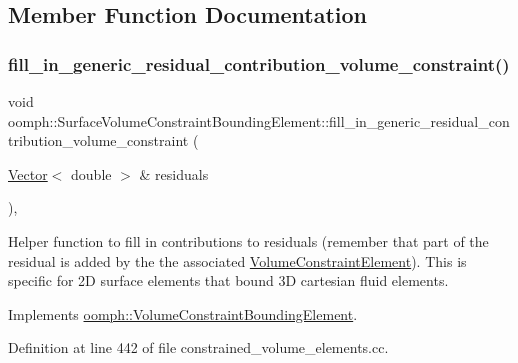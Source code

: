 \subsection{Member Function Documentation}
\mbox{\label{classoomph_1_1SurfaceVolumeConstraintBoundingElement_a5813fa65063eb55a5b264539d77cac88}} 
\subsubsection{\texorpdfstring{fill\+\_\+in\+\_\+generic\+\_\+residual\+\_\+contribution\+\_\+volume\+\_\+constraint()}{fill\_in\_generic\_residual\_contribution\_volume\_constraint()}}
{\footnotesize\ttfamily void oomph\+::\+Surface\+Volume\+Constraint\+Bounding\+Element\+::fill\+\_\+in\+\_\+generic\+\_\+residual\+\_\+contribution\+\_\+volume\+\_\+constraint (\begin{DoxyParamCaption}\item[{\hyperlink{classoomph_1_1Vector}{Vector}$<$ double $>$ \&}]{residuals }\end{DoxyParamCaption})\hspace{0.3cm}{\ttfamily [protected]}, {\ttfamily [virtual]}}



Helper function to fill in contributions to residuals (remember that part of the residual is added by the the associated \hyperlink{classoomph_1_1VolumeConstraintElement}{Volume\+Constraint\+Element}). This is specific for 2D surface elements that bound 3D cartesian fluid elements. 



Implements \hyperlink{classoomph_1_1VolumeConstraintBoundingElement_a717f1085709bd8820b8043ff94ecb0c5}{oomph\+::\+Volume\+Constraint\+Bounding\+Element}.



Definition at line 442 of file constrained\+\_\+volume\+\_\+elements.\+cc.



